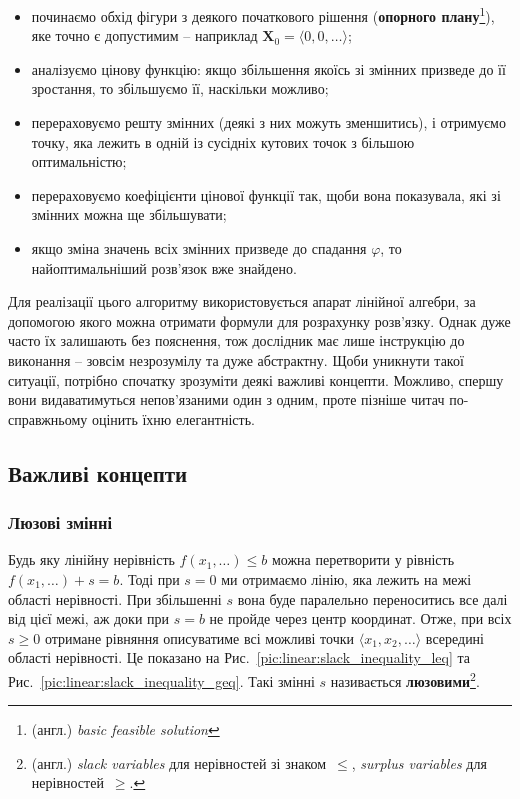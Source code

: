 \documentclass[\main/book.tex]{subfiles}
\begin{document}
\begin{itemize}
 \item починаємо обхід фігури з деякого початкового рішення (\textbf{опорного плану}\footnote{(англ.) \textit{basic feasible solution}}), яке точно є допустимим -- наприклад $\mathbf{X}_0 = {\langle 0, 0, \ldots \rangle}$;
 \item аналізуємо цінову функцію: якщо збільшення якоїсь зі змінних призведе до її зростання, то збільшуємо її, наскільки можливо;
 \item перераховуємо решту змінних (деякі з них можуть зменшитись), і отримуємо точку, яка лежить в одній із сусідніх кутових точок з більшою оптимальністю;
 \item перераховуємо коефіцієнти цінової функції так, щоби вона показувала, які зі змінних можна ще збільшувати;
 \item якщо зміна значень всіх змінних призведе до спадання $\varphi$, то найоптимальніший розв'язок вже знайдено.
\end{itemize}

Для реалізації цього алгоритму використовується апарат лінійної алгебри, за допомогою якого можна отримати формули для розрахунку розв'язку. Однак дуже часто їх залишають без пояснення, тож дослідник має лише інструкцію до виконання -- зовсім незрозумілу та дуже абстрактну. Щоби уникнути такої ситуації, потрібно спочатку зрозуміти деякі важливі концепти. Можливо, спершу вони видаватимуться непов'язаними один з одним, проте пізніше читач по-справжньому оцінить їхню елегантність.

\subsection{Важливі концепти}

\subsubsection{Люзові змінні}

Будь яку лінійну нерівність $f(x_1, \ldots) \leq b$ можна перетворити у рівність $f(x_1, \ldots) + s = b$. Тоді при ${s=0}$ ми отримаємо лінію, яка лежить на межі області нерівності. При збільшенні $s$ вона буде паралельно переноситись все далі від цієї межі, аж доки при $s=b$ не пройде через центр координат. Отже, при всіх $s \geq 0$ отримане рівняння описуватиме всі можливі точки $\langle x_1, x_2, \ldots \rangle$ всередині області нерівності. Це показано на Рис.~\ref{pic:linear:slack_inequality_leq} та Рис.~\ref{pic:linear:slack_inequality_geq}. Такі змінні $s$ називається \textbf{люзовими}\footnote{(англ.) \textit{slack variables} для нерівностей зі знаком~\flqq{}$\leq$\frqq{}, \textit{surplus variables} для нерівностей~\flqq{}$\geq$\frqq{}.}.
\end{document}

